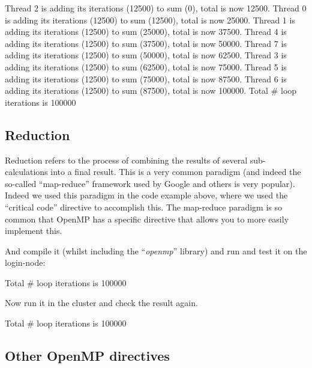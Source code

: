 \begin{prompt}
Thread 2 is adding its iterations (12500) to sum (0), total is now 12500.
Thread 0 is adding its iterations (12500) to sum (12500), total is now 25000.
Thread 1 is adding its iterations (12500) to sum (25000), total is now 37500.
Thread 4 is adding its iterations (12500) to sum (37500), total is now 50000.
Thread 7 is adding its iterations (12500) to sum (50000), total is now 62500.
Thread 3 is adding its iterations (12500) to sum (62500), total is now 75000.
Thread 5 is adding its iterations (12500) to sum (75000), total is now 87500.
Thread 6 is adding its iterations (12500) to sum (87500), total is now 100000.
Total # loop iterations is 100000
\end{prompt}

\subsection{Reduction}

Reduction refers to the process of combining the results of several
sub-calculations into a final result. This is a very common paradigm (and
indeed the so-called ``map-reduce'' framework used by Google and others is very
popular). Indeed we used this paradigm in the code example above, where we used
the ``critical code'' directive to accomplish this. The map-reduce paradigm is so
common that OpenMP has a specific directive that allows you to more easily
implement this.


And compile it (whilst including the ``\emph{openmp}'' library) and run and
test it on the login-node:

\begin{prompt}
Total # loop iterations is 100000
\end{prompt}

Now run it in the cluster and check the result again.

\begin{prompt}
Total # loop iterations is 100000
\end{prompt}

\subsection{Other OpenMP directives}

